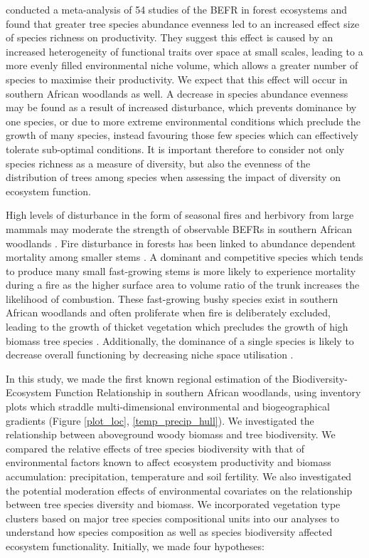 \documentclass[11pt,a4paper]{article}
\begin{document}
\citep{Zhang2012} conducted a meta-analysis of 54 studies of the BEFR in forest ecosystems and found that greater tree species abundance evenness led to an increased effect size of species richness on productivity. They suggest this effect is caused by an increased heterogeneity of functional traits over space at small scales, leading to a more evenly filled environmental niche volume, which allows a greater number of species to maximise their productivity. We expect that this effect will occur in southern African woodlands as well. A decrease in species abundance evenness may be found as a result of increased disturbance, which prevents dominance by one species, or due to more extreme environmental conditions which preclude the growth of many species, instead favouring those few species which can effectively tolerate sub-optimal conditions. It is important therefore to consider not only species richness as a measure of diversity, but also the evenness of the distribution of trees among species when assessing the impact of diversity on ecosystem function.

High levels of disturbance in the form of seasonal fires and herbivory from large mammals may moderate the strength of observable BEFRs in southern African woodlands \citep{Staver2009, Bond2005}. Fire disturbance in forests has been linked to abundance dependent mortality among smaller stems \citep{Roques2001}. A dominant and competitive species which tends to produce many small fast-growing stems is more likely to experience mortality during a fire as the higher surface area to volume ratio of the trunk increases the likelihood of combustion. These fast-growing bushy species exist in southern African woodlands and often proliferate when fire is deliberately excluded, leading to the growth of thicket vegetation which precludes the growth of high biomass tree species \citep{Higgins2007}. Additionally, the dominance of a single species is likely to decrease overall functioning by decreasing niche space utilisation \citep{Cardinale2002}.

In this study, we made the first known regional estimation of the Biodiversity-Ecosystem Function Relationship in southern African woodlands, using inventory plots which straddle multi-dimensional environmental and biogeographical gradients (Figure \autoref{plot_loc}, \autoref{temp_precip_hull}). We investigated the relationship between aboveground woody biomass and tree biodiversity. We compared the relative effects of tree species biodiversity with that of environmental factors known to affect ecosystem productivity and biomass accumulation: precipitation, temperature and soil fertility. We also investigated the potential moderation effects of environmental covariates on the relationship between tree species diversity and biomass. We incorporated vegetation type clusters based on major tree species compositional units into our analyses to understand how species composition as well as species biodiversity affected ecosystem functionality. Initially, we made four hypotheses: 
\end{document}
